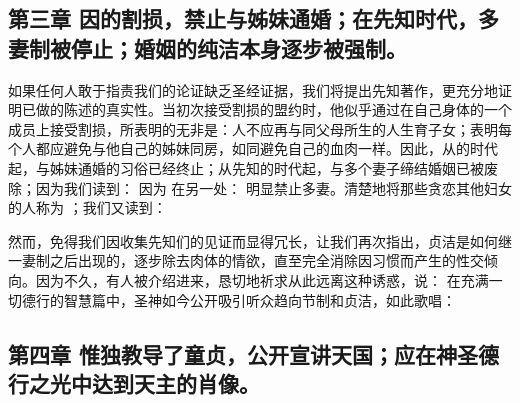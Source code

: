 
\subsection{第三章 因的割损，禁止与姊妹通婚；在先知时代，多妻制被停止；婚姻的纯洁本身逐步被强制。}

如果任何人敢于指责我们的论证缺乏圣经证据，我们将提出先知著作，更充分地证明已做的陈述的真实性。当初次接受割损的盟约时，他似乎通过在自己身体的一个成员上接受割损，所表明的无非是：人不应再与同父母所生的人生育子女；表明每个人都应避免与他自己的姊妹同房，如同避免自己的血肉一样。因此，从的时代起，与姊妹通婚的习俗已经终止；从先知的时代起，与多个妻子缔结婚姻已被废除；因为我们读到：  因为  在另一处：  明显禁止多妻。清楚地将那些贪恋其他妇女的人称为 ；我们又读到： \par

然而，免得我们因收集先知们的见证而显得冗长，让我们再次指出，贞洁是如何继一妻制之后出现的，逐步除去肉体的情欲，直至完全消除因习惯而产生的性交倾向。因为不久，有人被介绍进来，恳切地祈求从此远离这种诱惑，说： 在充满一切德行的智慧篇中，圣神如今公开吸引听众趋向节制和贞洁，如此歌唱： \par


\subsection{第四章 惟独教导了童贞，公开宣讲天国；应在神圣德行之光中达到天主的肖像。}

